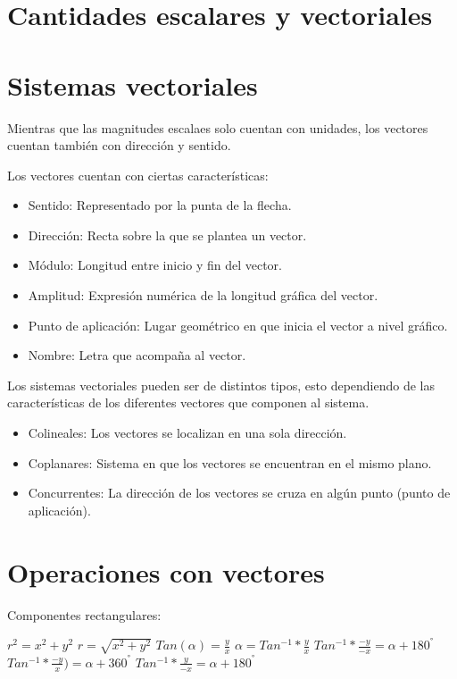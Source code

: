 


\section{Cantidades escalares y vectoriales}




\section{Sistemas vectoriales}


Mientras que las magnitudes escalaes solo cuentan con unidades, los vectores cuentan también con dirección y sentido.

Los vectores cuentan con ciertas características:

\begin{itemize}
    \item Sentido: Representado por la punta de la flecha.
    \item Dirección: Recta sobre la que se plantea un vector.
    \item Módulo: Longitud entre inicio y fin del vector.
    \item Amplitud: Expresión numérica de la longitud gráfica del vector.
    \item Punto de aplicación: Lugar geométrico en que inicia el vector a nivel gráfico.
    \item Nombre: Letra que acompaña al vector.
\end{itemize}


Los sistemas vectoriales pueden ser de distintos tipos, esto dependiendo de las características de los diferentes vectores que componen al sistema.

\begin{itemize}
    \item Colineales: Los vectores se localizan en una sola dirección.
    \item Coplanares: Sistema en que los vectores se encuentran en el mismo plano.
    \item Concurrentes: La dirección de los vectores se cruza en algún punto (punto de aplicación).
\end{itemize}

\section{Operaciones con vectores}

Componentes rectangulares:

$r^2=x^2+y^2$
$r=\sqrt{x^2+y^2}$
$Tan(α)=\frac{y}{x}$
$α=Tan^{-1}*\frac{y}{x}$
$Tan^{-1}*\frac{-y}{-x}=α+180^°$
$Tan^{-1}*\frac{-y}{x})=α+360^°$
$Tan^{-1}*\frac{y}{-x}=α+180^°$
